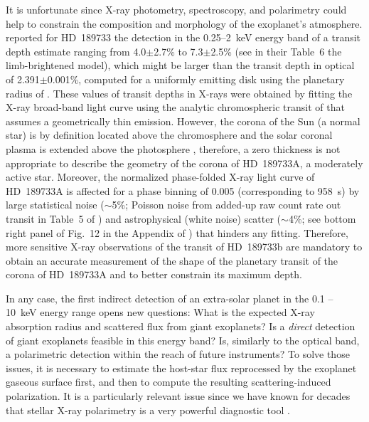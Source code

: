 \documentclass[iop]{emulateapj}
\begin{document}
It is unfortunate since X-ray photometry, spectroscopy, and polarimetry could help to constrain the composition and morphology of the 
exoplanet's atmosphere. \citet{Poppenhaeger2013} reported for HD~189733 the detection in the 0.25--2~keV energy band of a transit depth
estimate ranging from 4.0$\pm$2.7\% to 7.3$\pm$2.5\% (see in their Table~6 the limb-brightened model), which might be larger than the 
transit depth in optical of 2.391$\pm$0.001\%, computed for a uniformly emitting disk using the planetary radius 
of \citet{Torres2008}. These values of transit depths in X-rays were obtained by fitting the X-ray broad-band light curve 
using the analytic chromospheric transit of \citet{Schlawin2010} that assumes a geometrically thin emission. However, the 
corona of the Sun (a normal star) is by definition located above the chromosphere and the solar coronal plasma is extended above 
the photosphere \citep[see for a review on the solar corona, e.g.,][]{Aschwanden2004}, therefore, a zero thickness is not appropriate 
to describe the geometry of the corona of HD~189733A, a moderately active star. Moreover, the normalized phase-folded X-ray light 
curve of HD~189733A is affected for a phase binning of 0.005 (corresponding to 958~s) by large statistical noise ($\sim$5\%; 
Poisson noise from added-up raw count rate out transit in Table~5 of \citealt{Poppenhaeger2013}) and astrophysical (white noise) scatter 
($\sim$4\%; see bottom right panel of Fig.~12 in the Appendix of \citealt{Poppenhaeger2013}) that hinders any fitting.
Therefore, more sensitive X-ray observations of the transit of HD~189733b are mandatory to obtain an accurate measurement 
of the shape of the planetary transit of the corona of HD~189733A and to better constrain its maximum depth.

In any case, the first indirect detection of an extra-solar planet in the 0.1 -- 10~keV energy 
range opens new questions: What is the expected X-ray absorption radius and scattered flux from giant exoplanets? Is a \textit{direct} 
detection of giant exoplanets feasible in this energy band? Is, similarly to the optical band, a polarimetric detection within the reach 
of future instruments? To solve those issues, it is necessary to estimate the host-star flux reprocessed by the exoplanet gaseous surface 
first, and then to compute the resulting scattering-induced polarization. It is a particularly relevant issue since we have known for 
decades that stellar X-ray polarimetry is a very powerful diagnostic tool \citep[e.g.,][]{Manzo1993}. 
\end{document}
